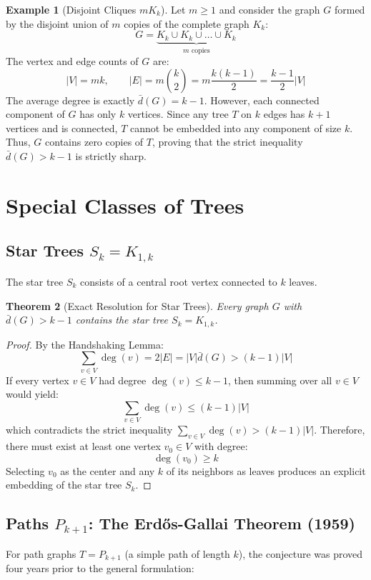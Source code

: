 \documentclass[11pt,a4paper]{article}
\newtheorem{theorem}{Theorem}[section]
\theoremstyle{definition}
\newtheorem{example}[theorem]{Example}
\begin{document}
\begin{example}[Disjoint Cliques $m K_k$]\label{ex:cliques}
Let $m \ge 1$ and consider the graph $G$ formed by the disjoint union of $m$ copies of the complete graph $K_k$:
\[ G = \underbrace{K_k \cup K_k \cup \dots \cup K_k}_{m \text{ copies}} \]
The vertex and edge counts of $G$ are:
\[ |V| = m k, \qquad |E| = m \binom{k}{2} = m \frac{k(k - 1)}{2} = \frac{k - 1}{2} |V| \]
The average degree is exactly $\bar{d}(G) = k - 1$.
However, each connected component of $G$ has only $k$ vertices.
Since any tree $T$ on $k$ edges has $k + 1$ vertices and is connected, $T$ cannot be embedded into any component of size $k$.
Thus, $G$ contains zero copies of $T$, proving that the strict inequality $\bar{d}(G) > k - 1$ is strictly sharp.
\end{example}

\section{Special Classes of Trees}

\subsection{Star Trees $S_k = K_{1, k}$}
The star tree $S_k$ consists of a central root vertex connected to $k$ leaves.

\begin{theorem}[Exact Resolution for Star Trees]\label{thm:star_trees}
Every graph $G$ with $\bar{d}(G) > k - 1$ contains the star tree $S_k = K_{1, k}$.
\end{theorem}

\begin{proof}
By the Handshaking Lemma:
\[ \sum_{v \in V} \deg(v) = 2 |E| = |V| \bar{d}(G) > (k - 1) |V| \]
If every vertex $v \in V$ had degree $\deg(v) \le k - 1$, then summing over all $v \in V$ would yield:
\[ \sum_{v \in V} \deg(v) \le (k - 1) |V| \]
which contradicts the strict inequality $\sum_{v \in V} \deg(v) > (k - 1) |V|$.
Therefore, there must exist at least one vertex $v_0 \in V$ with degree:
\[ \deg(v_0) \ge k \]
Selecting $v_0$ as the center and any $k$ of its neighbors as leaves produces an explicit embedding of the star tree $S_k$.
\end{proof}

\subsection{Paths $P_{k+1}$: The Erd\H{o}s-Gallai Theorem (1959)}
For path graphs $T = P_{k+1}$ (a simple path of length $k$), the conjecture was proved four years prior to the general formulation:
\end{document}
